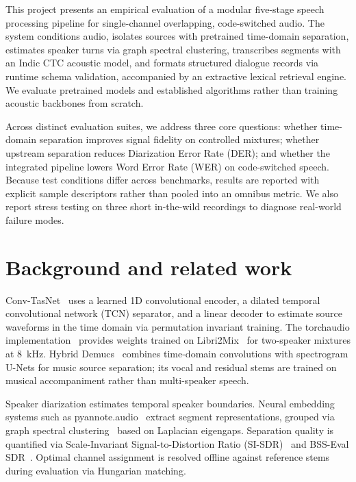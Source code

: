 \documentclass[11pt,a4paper,twocolumn]{article}
\begin{document}
This project presents an empirical evaluation of a modular five-stage speech processing pipeline for single-channel overlapping, code-switched audio. The system conditions audio, isolates sources with pretrained time-domain separation, estimates speaker turns via graph spectral clustering, transcribes segments with an Indic CTC acoustic model, and formats structured dialogue records via runtime schema validation, accompanied by an extractive lexical retrieval engine. We evaluate pretrained models and established algorithms rather than training acoustic backbones from scratch.

Across distinct evaluation suites, we address three core questions: whether time-domain separation improves signal fidelity on controlled mixtures; whether upstream separation reduces Diarization Error Rate (DER); and whether the integrated pipeline lowers Word Error Rate (WER) on code-switched speech. Because test conditions differ across benchmarks, results are reported with explicit sample descriptors rather than pooled into an omnibus metric. We also report stress testing on three short in-the-wild recordings to diagnose real-world failure modes.

\section{Background and related work}
Conv-TasNet~\cite{luo2019convtasnet} uses a learned 1D convolutional encoder, a dilated temporal convolutional network (TCN) separator, and a linear decoder to estimate source waveforms in the time domain via permutation invariant training. The torchaudio implementation~\cite{yang2022torchaudio} provides weights trained on Libri2Mix~\cite{cosentino2020librimix} for two-speaker mixtures at 8~kHz. Hybrid Demucs~\cite{defossez2021demucs} combines time-domain convolutions with spectrogram U-Nets for music source separation; its vocal and residual stems are trained on musical accompaniment rather than multi-speaker speech.

Speaker diarization estimates temporal speaker boundaries. Neural embedding systems such as pyannote.audio~\cite{bredin2020pyannote} extract segment representations, grouped via graph spectral clustering~\cite{ng2001spectral} based on Laplacian eigengaps. Separation quality is quantified via Scale-Invariant Signal-to-Distortion Ratio (SI-SDR)~\cite{leroux2019sisdr} and BSS-Eval SDR~\cite{vincent2006performance}. Optimal channel assignment is resolved offline against reference stems during evaluation via Hungarian matching.
\end{document}
